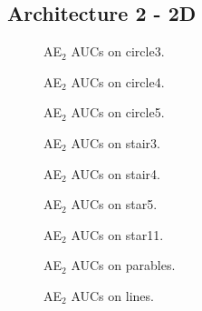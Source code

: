 \subsection{Architecture 2 - 2D}
\label{subsec:results_ae_2841482}
\begin{figure}[h!]
         \centering
         
         \caption{AE$_2$ AUCs on circle3.}
\end{figure}
\begin{figure}[h!]
         \centering
         
         \caption{AE$_2$ AUCs on circle4.}
\end{figure}
\begin{figure}[h!]
         \centering
         
         \caption{AE$_2$ AUCs on circle5.}
\end{figure}
\begin{figure}[h!]
         \centering
         
         \caption{AE$_2$ AUCs on stair3.}
\end{figure}
\begin{figure}[h!]
         \centering
         
         \caption{AE$_2$ AUCs on stair4.}
\end{figure}
\begin{figure}[h!]
         \centering
         
         \caption{AE$_2$ AUCs on star5.}
\end{figure}
\begin{figure}[h!]
         \centering
         
         \caption{AE$_2$ AUCs on star11.}
\end{figure}
\begin{figure}[h!]
         \centering
         
         \caption{AE$_2$ AUCs on parables.}
\end{figure}
\begin{figure}[h!]
         \centering
         
         \caption{AE$_2$ AUCs on lines.}
\end{figure}
\clearpage


